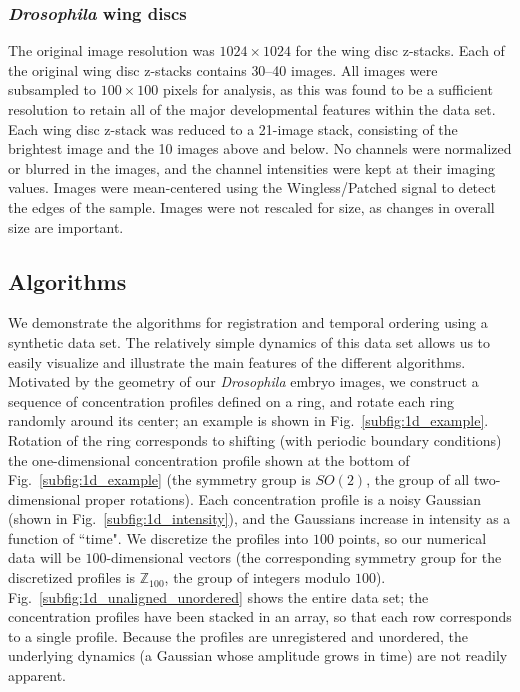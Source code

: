 \documentclass[10pt,twocolumn]{article}
\newcommand{\fig}[0]{Fig.}
\begin{document}
\subsubsection*{{\em Drosophila} wing discs}

The original image resolution was $1024 \times 1024$ for the wing disc z-stacks.
%
Each of the original wing disc z-stacks contains 30--40 images. 
%
All images were subsampled to $100 \times 100$ pixels for analysis, as this was found to be a sufficient resolution to retain all of the major developmental features within the data set. 
%
Each wing disc z-stack was reduced to a 21-image stack, consisting of the brightest image and the 10 images above and below.
%
No channels were normalized or blurred in the images, and the channel intensities were kept at their imaging values. 
%
Images were mean-centered using the Wingless/Patched signal to detect the edges of the sample. 
%
Images were not rescaled for size, as changes in overall size are important. 

\subsection*{Algorithms}

We demonstrate the algorithms for registration and temporal ordering using a synthetic data set.
%
The relatively simple dynamics of this data set allows us to easily visualize and illustrate the main features of the different algorithms.
%
Motivated by the geometry of our {\em Drosophila} embryo images, we construct a sequence of concentration profiles defined on a ring, and rotate each ring randomly around its center; an example is shown in \fig~\ref{subfig:1d_example}.
%
Rotation of the ring corresponds to shifting (with periodic boundary conditions) the one-dimensional concentration profile shown at the bottom of \fig~\ref{subfig:1d_example} (the symmetry group is $SO(2)$, the group of all two-dimensional proper rotations).
%
Each concentration profile is a noisy Gaussian (shown in \fig~\ref{subfig:1d_intensity}), and the Gaussians increase in intensity as a function of ``time".
%
We discretize the profiles into $100$ points, so our numerical data will be $100$-dimensional vectors (the corresponding symmetry group for the discretized profiles is $\mathbb{Z}_{100}$, the group of integers modulo $100$).
%
\fig~\ref{subfig:1d_unaligned_unordered} shows the entire data set; the concentration profiles have been stacked in an array, so that each row corresponds to a single profile.
%
Because the profiles are unregistered and unordered, the underlying dynamics (a Gaussian whose amplitude grows in time) are not readily apparent.
\end{document}

